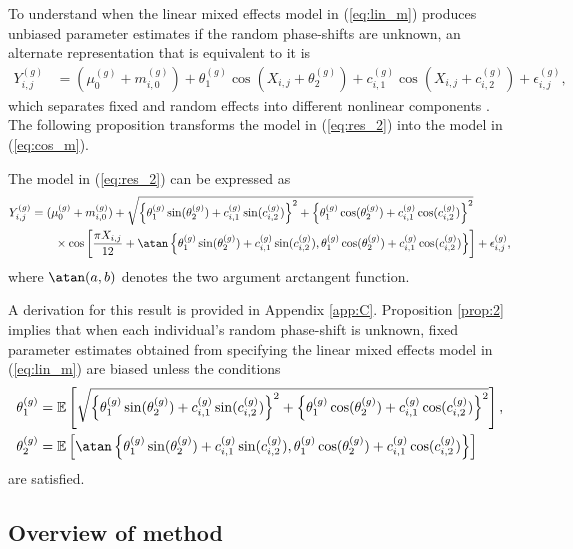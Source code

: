 To understand when the linear mixed effects model in (\ref{eq:lin_m}) produces unbiased parameter estimates if the random phase-shifts are unknown, an alternate representation that is equivalent to it is
\begin{align} \label{eq:res_2}
Y^{(g)}_{i,j} &= (\mu^{(g)}_0 + m^{(g)}_{i, 0}) + \theta^{(g)}_1\cos(X_{i,j}+\theta^{(g)}_{2}) + c^{(g)}_{i,1}\cos(X_{i,j}+c^{(g)}_{i,2}) + \epsilon^{(g)}_{i,j},
\end{align}
which separates fixed and random effects into different nonlinear components \citep{Mikulich2003}. The following proposition transforms the model in (\ref{eq:res_2}) into the model in (\ref{eq:cos_m}).
\begin{prop} \label{prop:2}
The model in (\ref{eq:res_2}) can be expressed as 
\begin{align*}
Y^{(g)}_{i,j} &= (\mu^{(g)}_0 + m^{(g)}_{i, 0}) + \sqrt{\left\{\theta^{(g)}_1\sin(\theta^{(g)}_2) + c^{(g)}_{i,1}\sin(c^{(g)}_{i,2})\right\}^2 + \left\{\theta^{(g)}_1\cos(\theta^{(g)}_2) + c^{(g)}_{i,1}\cos(c^{(g)}_{i,2})\right\}^2} \nonumber \\
    & \quad \quad \times \cos\left[\frac{\pi X_{i,j}}{12} + \atan\left\{\theta^{(g)}_1\sin(\theta^{(g)}_2) + c^{(g)}_{i,1}\sin(c^{(g)}_{i,2}), \theta^{(g)}_1\cos(\theta^{(g)}_2) + c^{(g)}_{i,1}\cos(c^{(g)}_{i,2})\right\}\right] + \epsilon^{(g)}_{i,j},
\end{align*}
where $\atan(a, b)$ denotes the two argument arctangent function.
\end{prop}
\noindent A derivation for this result is provided in Appendix \ref{app:C}. Proposition \ref{prop:2} implies that when each individual's random phase-shift is unknown, fixed parameter estimates obtained from specifying the linear mixed effects model in (\ref{eq:lin_m}) are biased unless the conditions
\begin{align*}
\theta_1^{(g)} &= \mathbb{E}\left[\sqrt{\left\{\theta^{(g)}_1\sin(\theta^{(g)}_2) + c^{(g)}_{i,1}\sin(c^{(g)}_{i,2})\right\}^2 + \left\{\theta^{(g)}_1\cos(\theta^{(g)}_2) + c^{(g)}_{i,1}\cos(c^{(g)}_{i,2})\right\}^2} \right], \\
\theta_2^{(g)} &= \mathbb{E}\left[\atan\left\{\theta^{(g)}_1\sin(\theta^{(g)}_2) + c^{(g)}_{i,1}\sin(c^{(g)}_{i,2}), \theta^{(g)}_1\cos(\theta^{(g)}_2) + c^{(g)}_{i,1}\cos(c^{(g)}_{i,2})\right\} \right]
\end{align*}
are satisfied.

\subsection{Overview of method} \label{sec:2.3}

